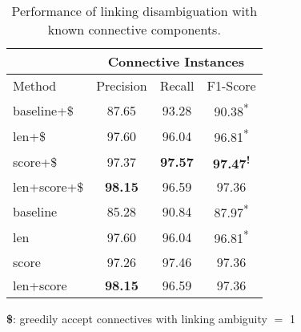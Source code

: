 \begin{table}[ht]
\centering
\begin{tabular}{|l|c|c|c|}
\hline
                        & \multicolumn{3}{c|}{Connective Instances}                 \\ \hline
Method                  &     Precision &     Recall &     F1-Score                 \\ \hline
baseline+\$             &     87.65     &     93.28  &     90.38\textsuperscript{*} \\ \hline
len+\$                  &     97.60     &     96.04  &     96.81\textsuperscript{*} \\ \hline
score+\$                &     97.37     & \bf 97.57  & \bf 97.47\textsuperscript{!} \\ \hline
len+score+\$            & \bf 98.15     &     96.59  &     97.36\textsuperscript{ } \\


\hhline{|=|=|=|=|}

baseline                &     85.28     &     90.84  &     87.97\textsuperscript{*} \\ \hline
len                     &     97.60     &     96.04  &     96.81\textsuperscript{*} \\ \hline
score                   &     97.26     &     97.46  &     97.36\textsuperscript{ } \\ \hline
len+score               & \bf 98.15     &     96.59  &     97.36\textsuperscript{ } \\ \hline

\end{tabular}
\begin{flushleft}
\small
\textbf{\$}: greedily accept connectives with linking ambiguity $=$ 1
\end{flushleft}
\caption{\label{t:linking-perfect-methods} Performance of linking
disambiguation with known connective components. }
\end{table}

